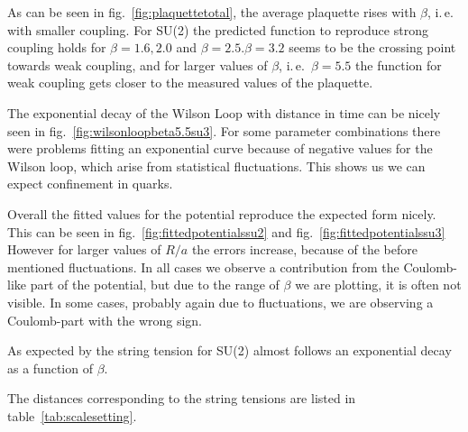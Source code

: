 \documentclass[%
 reprint,
 amsmath,amssymb,
 aps,
]{revtex4-1}
\begin{document}

As can be seen in fig.~\ref{fig:plaquettetotal}, the average
 plaquette rises with $\beta$, i.\,e.\, with smaller coupling. 
For SU(2) the predicted function to reproduce strong coupling holds for $\beta=1.6, 2.0$ and $\beta=2.5$.$\beta=3.2$ seems to be the crossing point towards weak coupling, and for larger values of $\beta$, i.\,e.\, $\beta=5.5$ the function for weak coupling gets closer to the measured values of the plaquette.

The exponential decay of the Wilson Loop with distance in time can be nicely seen in fig.~\ref{fig:wilsonloopbeta5.5su3}. For some parameter combinations there were problems fitting an exponential curve because of negative values for the Wilson loop, which arise from statistical fluctuations. This shows us we can expect confinement in quarks.


Overall the fitted values for the potential reproduce the expected form nicely. This can be seen in fig.~\ref{fig:fittedpotentialssu2} and fig.~\ref{fig:fittedpotentialssu3} However for larger values of $R/a$ the errors increase, because of the before mentioned fluctuations. In all cases we observe a contribution from the Coulomb-like part of the potential, but due to the range of $\beta$ we are plotting, it is often not visible. In some cases, probably again due to fluctuations, we are observing a Coulomb-part with the wrong sign. 


As expected by \citet{creutzsu2} the string tension for SU(2) almost follows an exponential decay as a function of $\beta$.



The distances corresponding to the string tensions are listed in table~\ref{tab:scalesetting}.
\end{document}
